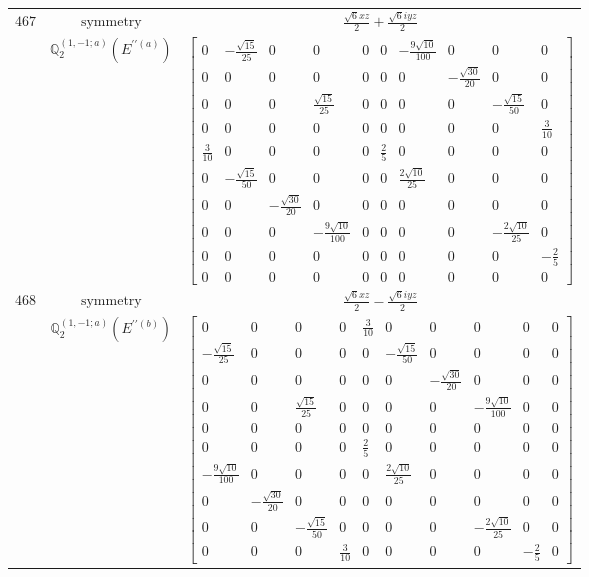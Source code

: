 \documentclass[fleqn,8pt,landscape]{jsarticle}
\begin{document}
\begin{longtable}{ccc}
$ 467 $ & $ \text{symmetry} $ & $ \frac{\sqrt{6} x z}{2} + \frac{\sqrt{6} i y z}{2} $ \\
$  $ & $ \mathbb{Q}_{2}^{(1,-1;a)}(E^{\prime\prime(a)}) $ & $ \begin{bmatrix} 0 & - \frac{\sqrt{15}}{25} & 0 & 0 & 0 & 0 & - \frac{9 \sqrt{10}}{100} & 0 & 0 & 0 \\ 0 & 0 & 0 & 0 & 0 & 0 & 0 & - \frac{\sqrt{30}}{20} & 0 & 0 \\ 0 & 0 & 0 & \frac{\sqrt{15}}{25} & 0 & 0 & 0 & 0 & - \frac{\sqrt{15}}{50} & 0 \\ 0 & 0 & 0 & 0 & 0 & 0 & 0 & 0 & 0 & \frac{3}{10} \\ \frac{3}{10} & 0 & 0 & 0 & 0 & \frac{2}{5} & 0 & 0 & 0 & 0 \\ 0 & - \frac{\sqrt{15}}{50} & 0 & 0 & 0 & 0 & \frac{2 \sqrt{10}}{25} & 0 & 0 & 0 \\ 0 & 0 & - \frac{\sqrt{30}}{20} & 0 & 0 & 0 & 0 & 0 & 0 & 0 \\ 0 & 0 & 0 & - \frac{9 \sqrt{10}}{100} & 0 & 0 & 0 & 0 & - \frac{2 \sqrt{10}}{25} & 0 \\ 0 & 0 & 0 & 0 & 0 & 0 & 0 & 0 & 0 & - \frac{2}{5} \\ 0 & 0 & 0 & 0 & 0 & 0 & 0 & 0 & 0 & 0 \end{bmatrix} $ \\ \hline
$ 468 $ & $ \text{symmetry} $ & $ \frac{\sqrt{6} x z}{2} - \frac{\sqrt{6} i y z}{2} $ \\
$  $ & $ \mathbb{Q}_{2}^{(1,-1;a)}(E^{\prime\prime(b)}) $ & $ \begin{bmatrix} 0 & 0 & 0 & 0 & \frac{3}{10} & 0 & 0 & 0 & 0 & 0 \\ - \frac{\sqrt{15}}{25} & 0 & 0 & 0 & 0 & - \frac{\sqrt{15}}{50} & 0 & 0 & 0 & 0 \\ 0 & 0 & 0 & 0 & 0 & 0 & - \frac{\sqrt{30}}{20} & 0 & 0 & 0 \\ 0 & 0 & \frac{\sqrt{15}}{25} & 0 & 0 & 0 & 0 & - \frac{9 \sqrt{10}}{100} & 0 & 0 \\ 0 & 0 & 0 & 0 & 0 & 0 & 0 & 0 & 0 & 0 \\ 0 & 0 & 0 & 0 & \frac{2}{5} & 0 & 0 & 0 & 0 & 0 \\ - \frac{9 \sqrt{10}}{100} & 0 & 0 & 0 & 0 & \frac{2 \sqrt{10}}{25} & 0 & 0 & 0 & 0 \\ 0 & - \frac{\sqrt{30}}{20} & 0 & 0 & 0 & 0 & 0 & 0 & 0 & 0 \\ 0 & 0 & - \frac{\sqrt{15}}{50} & 0 & 0 & 0 & 0 & - \frac{2 \sqrt{10}}{25} & 0 & 0 \\ 0 & 0 & 0 & \frac{3}{10} & 0 & 0 & 0 & 0 & - \frac{2}{5} & 0 \end{bmatrix} $ \\ \hline

\end{longtable}
\end{document}
